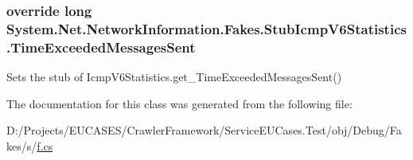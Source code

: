 \hypertarget{class_system_1_1_net_1_1_network_information_1_1_fakes_1_1_stub_icmp_v6_statistics_a3a87cbf8d99f117762e779c307644e0b}{
\subsubsection[{Time\-Exceeded\-Messages\-Sent}]{\setlength{\rightskip}{0pt plus 5cm}override long System.\-Net.\-Network\-Information.\-Fakes.\-Stub\-Icmp\-V6\-Statistics.\-Time\-Exceeded\-Messages\-Sent\hspace{0.3cm}{\ttfamily [get]}}}\label{class_system_1_1_net_1_1_network_information_1_1_fakes_1_1_stub_icmp_v6_statistics_a3a87cbf8d99f117762e779c307644e0b}


Sets the stub of Icmp\-V6\-Statistics.\-get\-\_\-\-Time\-Exceeded\-Messages\-Sent()



The documentation for this class was generated from the following file\-:\begin{DoxyCompactItemize}
\item 
D\-:/\-Projects/\-E\-U\-C\-A\-S\-E\-S/\-Crawler\-Framework/\-Service\-E\-U\-Cases.\-Test/obj/\-Debug/\-Fakes/s/\hyperlink{s_2f_8cs}{f.\-cs}\end{DoxyCompactItemize}
